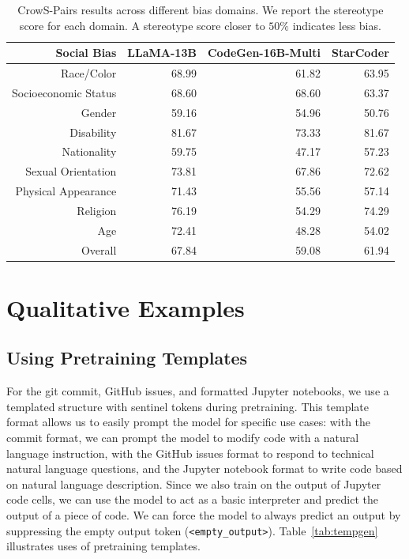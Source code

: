 \documentclass[10pt]{article} %
\begin{document}
\begin{table}[t]
    \centering
    \begin{tabular}{rrrr}
        \toprule 
        \textbf{Social Bias} & \textbf{LLaMA-13B} & \textbf{CodeGen-16B-Multi} & \textbf{StarCoder} \\
        \midrule
        Race/Color & 68.99 & 61.82 & 63.95 \\
        Socioeconomic Status & 68.60 & 68.60 & 63.37 \\
        Gender & 59.16 & 54.96 & 50.76 \\
        Disability & 81.67 & 73.33 & 81.67 \\
        Nationality & 59.75 & 47.17 & 57.23 \\
        Sexual Orientation & 73.81 & 67.86 & 72.62 \\
        Physical Appearance & 71.43	& 55.56	& 57.14 \\
        Religion & 76.19 & 54.29 & 74.29 \\
        Age & 72.41	& 48.28	& 54.02 \\
        Overall & 67.84 & 59.08 & 61.94 \\
        \bottomrule 
    \end{tabular}
    \caption{CrowS-Pairs results across different bias domains. We report the stereotype score for each domain. A stereotype score closer to $50\%$ indicates less bias.}
    \label{tab:crows_pairs}
\end{table}

\clearpage
\section{Qualitative Examples}\label{app:qualitative}

\subsection{Using Pretraining Templates}\label{sec:pretraining_templates}
For the git commit, GitHub issues, and formatted Jupyter notebooks, we use a templated structure with sentinel tokens during pretraining. This template format allows us to easily prompt the model for specific use cases: with the commit format, we can prompt the model to modify code with a natural language instruction, with the GitHub issues format to respond to technical natural language questions, and the Jupyter notebook format to write code based on natural language description. Since we also train on the output of Jupyter code cells, we can use the model to act as a basic interpreter and predict the output of a piece of code. We can force the model to always predict an output by suppressing the empty output token (\verb|<empty_output>|). Table~\ref{tab:tempgen} illustrates uses of pretraining templates.
\end{document}
